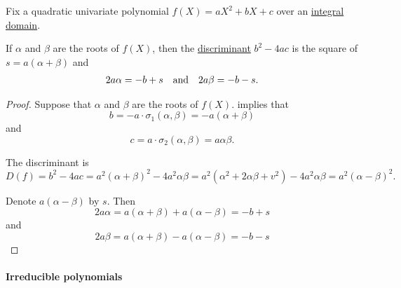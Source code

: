 \begin{proposition}\label{thm:quadratic_polynomial_roots}
  Fix a quadratic univariate polynomial \( f(X) = aX^2 + b X + c \) over an \hyperref[def:integral_domain]{integral domain}.

  If \( \alpha \) and \( \beta \) are the roots of \( f(X) \), then the \hyperref[def:discriminant]{discriminant} \( b^2 - 4ac \) is the square of \( s = a(\alpha + \beta) \) and
  \begin{align*}
    2a\alpha = -b + s
    &&\T{and}&&
    2a\beta = -b - s.
  \end{align*}
\end{proposition}
\begin{proof}
  Suppose that \( \alpha \) and \( \beta \) are the roots of \( f(X) \).  implies that
  \begin{equation*}
    b =  -a \cdot \sigma_1(\alpha, \beta) = -a(\alpha + \beta)
  \end{equation*}
  and
  \begin{equation*}
    c = a \cdot \sigma_2(\alpha, \beta) = a\alpha\beta.
  \end{equation*}

  The discriminant is
  \begin{equation*}
    D(f) = b^2 - 4ac = a^2(\alpha + \beta)^2 - 4a^2 \alpha\beta = a^2 (\alpha^2 + 2\alpha\beta + v^2) - 4a^2 \alpha\beta = a^2 (\alpha - \beta)^2.
  \end{equation*}

  Denote \( a(\alpha - \beta) \) by \( s \). Then
  \begin{equation*}
    2a\alpha = a(\alpha + \beta) + a(\alpha - \beta) = -b + s
  \end{equation*}
  and
  \begin{equation*}
    2a\beta = a(\alpha + \beta) - a(\alpha - \beta) = -b - s
  \end{equation*}
\end{proof}

\paragraph{Irreducible polynomials}

